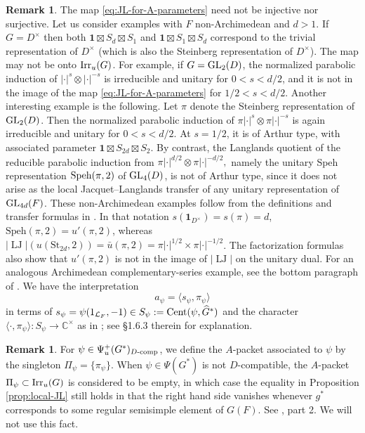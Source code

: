 \documentclass[11pt,reqno]{amsart}
\theoremstyle{plain}
\theoremstyle{definition}
\newtheorem{rem}[thm]{Remark}
\newcommand{\C}{\mathbb{C}}
\renewcommand{\cL}{\mathcal{L}}
\newcommand{\GL}{\tu{GL}}
\newcommand{\Irr}{\tu{Irr}}
\newcommand{\tu}{\textup}
\renewcommand{\hat}{\widehat}
\numberwithin{equation}{subsection}
\begin{document}
\begin{rem}\label{rem:not-inj-surj}
The map \eqref{eq:JL-for-A-parameters} need not be injective nor surjective. Let us consider examples with $F$ non-Archimedean and $d>1$. If $G=D^\times$ then both $\mathbf{1}\boxtimes S_d \boxtimes S_1$ and $\mathbf{1}\boxtimes S_1\boxtimes S_d$ correspond to the trivial representation of $D^\times$ (which is also the Steinberg representation of $D^\times$). 
The map may not be onto $\Irr_u(G)$.
For example, if $G = \GL_2(D)$, 
the normalized parabolic induction of $|\cdot|^s \otimes |\cdot|^{-s}$ is irreducible and unitary for $0 < s < d/2$, 
and it is not in the image of the map \eqref{eq:JL-for-A-parameters} for $1/2 < s < d/2$. Another interesting example is the following. Let $\pi$ denote the Steinberg representation of $\GL_2(D)$. Then the normalized parabolic induction of $\pi|\cdot|^s \otimes \pi|\cdot|^{-s}$ is again irreducible and unitary for $0 < s < d/2$. At $s=1/2$, it is of Arthur type, with associated parameter $\mathbf{1}\boxtimes S_{2d}\boxtimes S_2$. By contrast, the Langlands quotient of the reducible parabolic induction from $\pi|\cdot|^{d/2}\otimes \pi|\cdot|^{-d/2},$ namely the unitary Speh representation ${\rm Speh}(\pi,2)$ of $\GL_4(D)$, is not of Arthur type, since it does not arise as the local Jacquet--Langlands transfer of any unitary representation of $\GL_{4d}(F)$. These non-Archimedean examples follow from the definitions and transfer formulas in \cite[\S\S2.4, 2.9, 3.2--3.4, especially (2.1), (2.2), and (3.9)]{Bad}. In that notation $s(\mathbf{1}_{D^\times})=s(\pi)=d$, $\mathrm{Speh}(\pi,2)=u'(\pi,2)$, whereas $|\operatorname{LJ}|(u(\mathrm{St}_{2d},2))=\bar u(\pi,2)
=\pi|\cdot|^{1/2}\times\pi|\cdot|^{-1/2}$. The factorization formulas also show that $u'(\pi,2)$ is not in the image of $|\operatorname{LJ}|$ on the unitary dual. For an analogous Archimedean complementary-series example, see the bottom paragraph of \cite[p.~1118]{BadRen}.
We have the interpretation 
\begin{equation}\label{eq:apsi-via-spsi}
    a_\psi=\langle s_\psi,\pi_\psi\rangle
\end{equation}
in terms of $s_\psi=\psi(1_{\cL_F},-1)\in S_\psi:=\tu{Cent}(\psi,\hat G^*)$ and the character $\langle \cdot,\pi_\psi\rangle \colon S_\psi\to \C^\times$ as in \cite[Thm.~1.6.1]{KMSW}; see \S1.6.3 therein for explanation.
\end{rem}

\begin{rem}
For $\psi \in \Psi_u^+(G^*)_{D\tu{-comp}}$, 
we define the $A$-packet associated to $\psi$ 
by the singleton $\Pi_\psi = \{\pi_\psi\}$.
When $\psi\in \Psi(G^*)$ is not $D$-compatible, the $A$-packet $\Pi_\psi\subset \Irr_u(G)$ is considered to be empty, in which case the equality in Proposition \ref{prop:local-JL} still holds in that the right hand side vanishes whenever $g^*$ corresponds to some regular semisimple element of $G(F)$. See \cite[Thm.~1.6.4]{KMSW}, part 2. We will not use this fact.
\end{rem}
\end{document}
